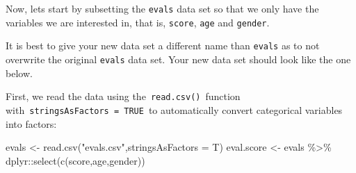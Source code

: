 \documentclass[
  letterpaper,
  DIV=11,
  numbers=noendperiod]{scrartcl}
\newenvironment{Shaded}{\begin{snugshade}}{\end{snugshade}}
\newcommand{\AttributeTok}[1]{\textcolor[rgb]{0.40,0.45,0.13}{#1}}
\newcommand{\FunctionTok}[1]{\textcolor[rgb]{0.28,0.35,0.67}{#1}}
\newcommand{\NormalTok}[1]{\textcolor[rgb]{0.00,0.23,0.31}{#1}}
\newcommand{\OtherTok}[1]{\textcolor[rgb]{0.00,0.23,0.31}{#1}}
\newcommand{\SpecialCharTok}[1]{\textcolor[rgb]{0.37,0.37,0.37}{#1}}
\newcommand{\StringTok}[1]{\textcolor[rgb]{0.13,0.47,0.30}{#1}}
\begin{document}
Now, lets start by subsetting the \texttt{evals} data set so that we
only have the variables we are interested in, that is, \texttt{score},
\texttt{age} and \texttt{gender}.

\begin{tcolorbox}[enhanced jigsaw, coltitle=black, bottomtitle=1mm, arc=.35mm, colframe=quarto-callout-note-color-frame, left=2mm, opacityback=0, colback=white, title=\textcolor{quarto-callout-note-color}{\faInfo}\hspace{0.5em}{Note}, toptitle=1mm, titlerule=0mm, breakable, rightrule=.15mm, bottomrule=.15mm, toprule=.15mm, colbacktitle=quarto-callout-note-color!10!white, leftrule=.75mm, opacitybacktitle=0.6]

It is best to give your new data set a different name than
\texttt{evals} as to not overwrite the original \texttt{evals} data set.
Your new data set should look like the one below.

\end{tcolorbox}

First, we read the data using the~\texttt{read.csv()}~function
with~\texttt{stringsAsFactors\ =\ TRUE}~to automatically convert
categorical variables into factors:

\begin{Shaded}
\begin{Highlighting}[]
\NormalTok{evals }\OtherTok{\textless{}{-}} \FunctionTok{read.csv}\NormalTok{(}\StringTok{"evals.csv"}\NormalTok{,}\AttributeTok{stringsAsFactors =}\NormalTok{ T)}
\NormalTok{eval.score }\OtherTok{\textless{}{-}}\NormalTok{ evals }\SpecialCharTok{\%\textgreater{}\%}
\NormalTok{  dplyr}\SpecialCharTok{::}\FunctionTok{select}\NormalTok{(}\FunctionTok{c}\NormalTok{(score,age,gender))}
\end{Highlighting}
\end{Shaded}
\end{document}
